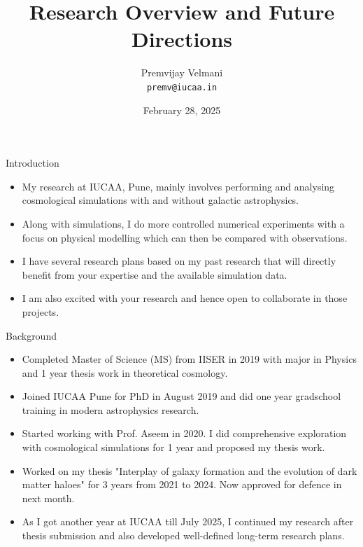 \documentclass{beamer}
\title[Research Overview]{Research Overview and Future Directions}
\author[Premvijay Velmani]{Premvijay Velmani \\ \texttt{premv@iucaa.in}}
\institute[IUCAA]{Inter-University Centre for Astronomy and Astrophysics (IUCAA)}
\date[Interview with Prof Raul Angulo]{February 28, 2025}
\begin{document}
\begin{frame}
    \titlepage
\end{frame}



\begin{frame}{Introduction}
\begin{itemize}
\item My research at IUCAA, Pune, mainly involves performing and analysing cosmological simulations with and without galactic astrophysics.
\item Along with simulations, I do more controlled numerical experiments with a focus on physical modelling which can then be compared with observations.
\item I have several research plans based on my past research that will directly benefit from your expertise and the available simulation data. 
\item I am also excited with your research and hence open to collaborate in those projects.
\end{itemize}
\end{frame}

\begin{frame}{Background}
    \begin{itemize}
        \item Completed Master of Science (MS) from IISER in 2019 with major in Physics and 1 year thesis work in theoretical cosmology.
        \item Joined IUCAA Pune for PhD in August 2019 and did one year gradschool training in modern astrophysics research.
        \item Started working with Prof. Aseem in 2020. I did comprehensive exploration with cosmological simulations for 1 year and proposed my thesis work.
        \item Worked on my thesis "Interplay of galaxy formation and the evolution of dark matter haloes" for 3 years from 2021 to 2024. Now approved for defence in next month.
        \item As I got another year at IUCAA till July 2025, I continued my research after thesis submission and also developed well-defined long-term research plans. 
    \end{itemize}
\end{frame}
\end{document}
